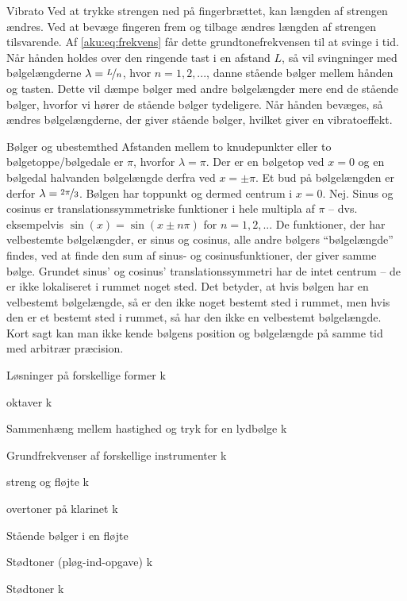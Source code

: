 \documentclass[crop=false, class=memoir]{standalone}
\begin{document}
\begin{opgave}[2]{Vibrato}
\opg Ved at trykke strengen ned på fingerbrættet, kan længden af strengen ændres. Ved at bevæge fingeren frem og tilbage ændres længden af strengen tilsvarende. Af \cref{aku:eq:frekvens} får dette grundtonefrekvensen til at svinge i tid.
\opg Når hånden holdes over den ringende tast i en afstand $L$, så vil svingninger med bølgelængderne $\lambda = \nicefrac{L}{n}$, hvor $n=1,2,...$, danne stående bølger mellem hånden og tasten. Dette vil dæmpe bølger med andre bølgelængder mere end de stående bølger, hvorfor vi hører de stående bølger tydeligere. Når hånden bevæges, så ændres bølgelængderne, der giver stående bølger, hvilket giver en vibratoeffekt.
\end{opgave}
\begin{opgave}[2]{Bølger og ubestemthed}
\opg Afstanden mellem to knudepunkter eller to bølgetoppe/bølgedale er $\pi$, hvorfor $\lambda = \pi$.
\opg Der er en bølgetop ved $x=0$ og en bølgedal halvanden bølgelængde derfra ved $x=\pm\pi$. Et bud på bølgelængden er derfor $\lambda=\nicefrac{2\pi}{3}$.
\opg Bølgen har toppunkt og dermed centrum i $x=0$.
\opg Nej. Sinus og cosinus er translationssymmetriske funktioner i hele multipla af $\pi$ -- dvs. eksempelvis $\sin(x) = \sin(x \pm n\pi)$ for $n=1,2,...$
\opg De funktioner, der har velbestemte bølgelængder, er sinus og cosinus, alle andre bølgers ``bølgelængde'' findes, ved at finde den sum af sinus- og cosinusfunktioner, der giver samme bølge. Grundet sinus' og cosinus' translationssymmetri har de intet centrum -- de er ikke lokaliseret i rummet noget sted. Det betyder, at hvis bølgen har en velbestemt bølgelængde, så er den ikke noget bestemt sted i rummet, men hvis den er et bestemt sted i rummet, så har den ikke en velbestemt bølgelængde. Kort sagt kan man ikke kende bølgens position og bølgelængde på samme tid med arbitrær præcision.
\end{opgave}
\begin{opgave}[2]{Løsninger på forskellige former}
k
\end{opgave}
\begin{opgave}[2]{oktaver}
k
\end{opgave}
\begin{opgave}[3]{Sammenhæng mellem hastighed og tryk for en lydbølge}
k
\end{opgave}
\begin{opgave}[1]{Grundfrekvenser af forskellige instrumenter}
k
\end{opgave}
\begin{opgave}[2]{streng og fløjte}
k
\end{opgave}
\begin{opgave}[3]{overtoner på klarinet}
k
\end{opgave}
\begin{opgave}{Stående bølger i en fløjte}
\end{opgave}
\begin{opgave}[1]{Stødtoner (pløg-ind-opgave)}
    k
\end{opgave}
\begin{opgave}[2]{Stødtoner}
    k
\end{opgave}
\end{document}
